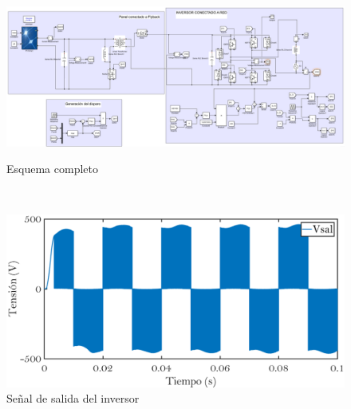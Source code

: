 \documentclass[	DIV=calc,%
							paper=letter,%
							fontsize=12pt%
                            ]{scrartcl}	 					%
\begin{document}
\newpage

\begin{figure}[h]
\centering

\includegraphics[scale=0.4]{cir_final}
\caption{Esquema completo}

\hfill
\

\includegraphics[scale=0.35]{v_fin}
\caption{Señal de salida del inversor}
\end{figure}
\end{document}
